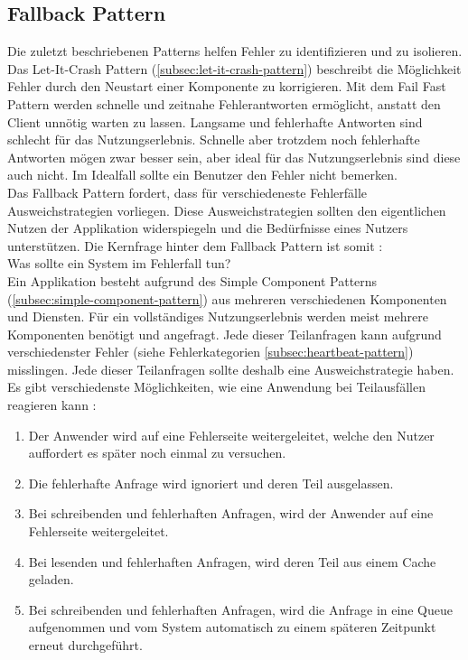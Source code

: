 \subsection{Fallback Pattern}
Die zuletzt beschriebenen Patterns helfen Fehler zu identifizieren und zu isolieren. Das Let-It-Crash Pattern (\ref{subsec:let-it-crash-pattern}) beschreibt die Möglichkeit Fehler durch den Neustart einer Komponente zu korrigieren. Mit dem Fail Fast Pattern werden schnelle und zeitnahe Fehlerantworten ermöglicht, anstatt den Client unnötig warten zu lassen. Langsame und fehlerhafte Antworten sind schlecht für das Nutzungserlebnis. Schnelle aber trotzdem noch fehlerhafte Antworten mögen zwar besser sein, aber ideal für das Nutzungserlebnis sind diese auch nicht. Im Idealfall sollte ein Benutzer den Fehler nicht bemerken.\\
Das Fallback Pattern fordert, dass für verschiedeneste Fehlerfälle Ausweichstrategien vorliegen. Diese Ausweichstrategien sollten den eigentlichen Nutzen der Applikation widerspiegeln und die Bedürfnisse eines Nutzers unterstützen. Die Kernfrage hinter dem Fallback Pattern ist somit \cite{friedrichsen_unkaputtbar_2014}:\\
Was sollte ein System im Fehlerfall tun?\\
Ein Applikation besteht aufgrund des Simple Component Patterns (\ref{subsec:simple-component-pattern}) aus mehreren verschiedenen Komponenten und Diensten. Für ein vollständiges Nutzungserlebnis werden meist mehrere Komponenten benötigt und angefragt. Jede dieser Teilanfragen kann aufgrund verschiedenster Fehler (siehe Fehlerkategorien \ref{subsec:heartbeat-pattern}) misslingen. Jede dieser Teilanfragen sollte deshalb eine Ausweichstrategie haben. Es gibt verschiedenste Möglichkeiten, wie eine Anwendung bei Teilausfällen reagieren kann \cite{friedrichsen_unkaputtbar_2014}:

\begin{enumerate}
\item Der Anwender wird auf eine Fehlerseite weitergeleitet, welche den Nutzer auffordert es später noch einmal zu versuchen.
\item Die fehlerhafte Anfrage wird ignoriert und deren Teil ausgelassen.
\item Bei schreibenden und fehlerhaften Anfragen, wird der Anwender auf eine Fehlerseite weitergeleitet.
\item Bei lesenden und fehlerhaften Anfragen, wird deren Teil aus einem Cache geladen.
\item Bei schreibenden und fehlerhaften Anfragen, wird die Anfrage in eine Queue aufgenommen und vom System automatisch zu einem späteren Zeitpunkt erneut durchgeführt.
\end{enumerate}

